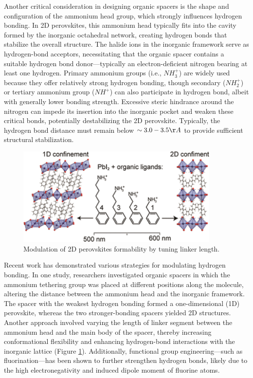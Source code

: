 Another critical consideration in designing organic spacers is the shape and configuration of the ammonium head group, which strongly influences hydrogen bonding. In 2D perovskites, this ammonium head typically fits into the cavity formed by the inorganic octahedral network, creating hydrogen bonds that stabilize the overall structure\cite{RN519,RN117}. The halide ions in the inorganic framework serve as hydrogen-bond acceptors, necessitating that the organic spacer contains a suitable hydrogen bond donor—typically an electron-deficient nitrogen bearing at least one hydrogen. Primary ammonium groups (i.e., $NH_3^+$) are widely used because they offer relatively strong hydrogen bonding, though secondary ($NH_2^+$) or tertiary ammonium group ($NH^+$) can also participate in hydrogen bond, albeit with generally lower bonding strength. Excessive steric hindrance around the nitrogen can impede its insertion into the inorganic pocket and weaken these critical bonds, potentially destabilizing the 2D perovskite. Typically, the hydrogen bond distance must remain below $\sim3.0-3.5 \AA$ to provide sufficient structural stabilization\cite{RN117}.

\begin{figure}[ht]
    \centering
    \includegraphics[width=0.9\textwidth]{figures/literature-review/figure2-14.png}
    \caption{Modulation of 2D perovskites formability by tuning linker length\cite{RN649}.}
    \label{fig:figure2.14}
\end{figure}

Recent work has demonstrated various strategies for modulating hydrogen bonding. In one study, researchers investigated organic spacers in which the ammonium tethering group was placed at different positions along the molecule, altering the distance between the ammonium head and the inorganic framework\cite{RN28}. The spacer with the weakest hydrogen bonding formed a one-dimensional (1D) perovskite, whereas the two stronger-bonding spacers yielded 2D structures. Another approach involved varying the length of linker segment between the ammonium head and the main body of the spacer, thereby increasing conformational flexibility and enhancing hydrogen-bond interactions with the inorganic lattice (Figure \ref{fig:figure2.14})\cite{RN86,RN649}. Additionally, functional group engineering—such as fluorination—has been shown to further strengthen hydrogen bonds, likely due to the high electronegativity and induced dipole moment of fluorine atoms\cite{RN211}.


